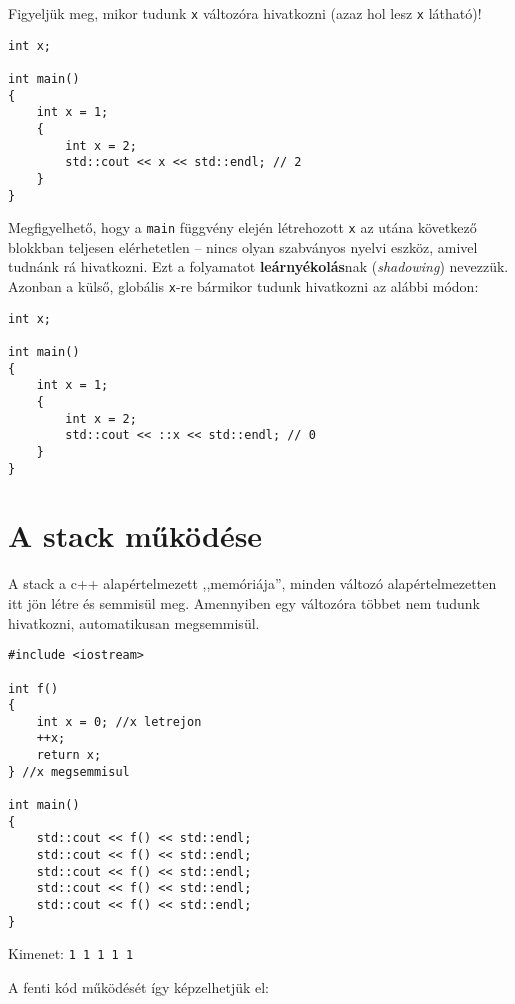 \documentclass[a4paper,11.5pt]{article}
\begin{document}
	Figyeljük meg, mikor tudunk \texttt{x} változóra hivatkozni (azaz hol lesz \texttt{x} látható)!
	\begin{lstlisting}
int x;

int main()
{
	int x = 1;
	{
		int x = 2;
		std::cout << x << std::endl; // 2
	}
}
	\end{lstlisting}
	Megfigyelhető, hogy a \texttt{main} függvény elején létrehozott \texttt{x} az utána következő blokkban teljesen elérhetetlen -- nincs olyan szabványos nyelvi eszköz, amivel tudnánk rá hivatkozni. Ezt a folyamatot \textbf{leárnyékolás}nak (\textit{shadowing}) nevezzük. Azonban a külső, globális \texttt{x}-re bármikor tudunk hivatkozni az alábbi módon:
	\begin{lstlisting}
int x;

int main()
{
	int x = 1;
	{
		int x = 2;
		std::cout << ::x << std::endl; // 0
	}
}
	\end{lstlisting}
	
	\section{A stack működése}
	A stack a c++ alapértelmezett ,,memóriája'', minden változó alapértelmezetten itt jön létre és semmisül meg. Amennyiben egy változóra többet nem tudunk hivatkozni, automatikusan megsemmisül.
	
	\begin{lstlisting}
#include <iostream>

int f()
{
	int x = 0; //x letrejon
	++x;
	return x;
} //x megsemmisul

int main()
{
	std::cout << f() << std::endl;
	std::cout << f() << std::endl;
	std::cout << f() << std::endl;
	std::cout << f() << std::endl;
	std::cout << f() << std::endl;
}
	\end{lstlisting}
	Kimenet: \texttt{1 1 1 1 1}
	\medskip
	
	A fenti kód működését így képzelhetjük el:
	
\end{document}
